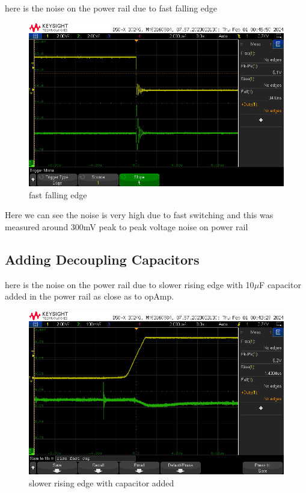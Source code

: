 \documentclass[a4paper,11pt]{article}%
\begin{document}
	
		here is the noise on the power rail due to fast falling edge 
		\begin{figure}[H]
			\centering
			\includegraphics[scale=0.6]{figures/fast_fall.png}
			\caption{fast falling edge }
		\end{figure}

		Here we can see the noise is very high due to fast switching and this was measured around 300mV peak to peak voltage noise on power rail
	

		\subsection{Adding Decoupling Capacitors}


		here is the noise on the power rail due to slower rising edge with 10$\mu$F capacitor added in the power rail as close as to opAmp.

		\begin{figure}[H]
			\centering
			\includegraphics[scale=0.6]{figures/rise_slow_cap.png}
			\caption{slower rising edge with capacitor added}
		\end{figure}
\end{document}
